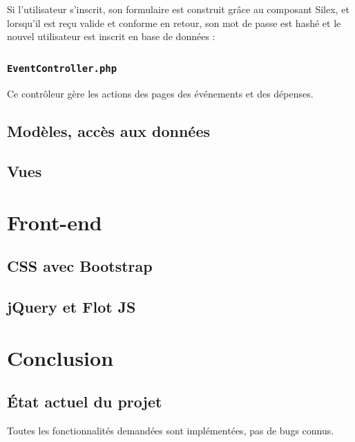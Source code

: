 \documentclass[a4paper, 12pt]{article}
\begin{document}
Si l'utilisateur s'inscrit, 
son formulaire est construit grâce au composant Silex, et lorsqu'il est reçu valide et conforme en retour, son 
mot de passe est hashé et le nouvel utilisateur est inscrit en base de données :


\subsubsection{\texttt{EventController.php}}
Ce contrôleur gère les actions des pages des événements et des dépenses. 

\subsection{Modèles, accès aux données}
\label{data_model_access}

\subsection{Vues}

\section{Front-end}
\subsection{CSS avec Bootstrap}
\subsection{jQuery et Flot JS}


\section{Conclusion}
\subsection{État actuel du projet}
Toutes les fonctionnalités demandées sont implémentées, pas de bugs connus.
\end{document}
